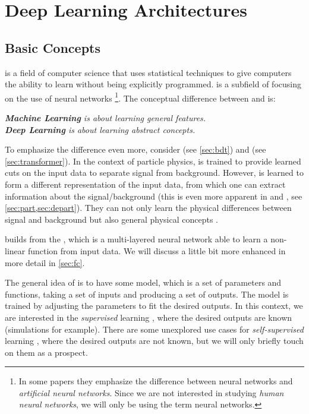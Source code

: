 \chapter{Deep Learning Architectures}

\section{Basic Concepts}
\label{sec:basic_concepts}
\emph{\ml} is a field of computer science that uses statistical techniques to give computers the ability to learn without being explicitly programmed.
\emph{\dl} is a subfield of \ml focusing on the use of neural networks \footnote{In some papers they emphasize the difference between neural networks and \emph{artificial neural networks}. Since we are not interested in studying \emph{human neural networks}, we will only be using the term neural networks.}.
The conceptual difference between \ml and \dl is:
\begin{center}
    \emph{\textbf{Machine Learning} is about learning general features. \\ \textbf{Deep Learning} is about learning abstract concepts.}
\end{center}

To emphasize the difference even more, consider \bdt (see \cref{sec:bdt}) and \trans (see \cref{sec:transformer}). 
In the context of particle physics, \bdt is trained to provide learned cuts on the input data to separate signal from background.
However, \trans is learned to form a different representation of the input data, from which one can extract information about the signal/background (this is even more apparent in \ParT and \depart, see \cref{sec:part,sec:depart}).
They can not only learn the physical differences between signal and background but also general physical concepts \cite{qcd_as_nlp}. 

\dl builds from the \mlp \cite{mlp}, which is a multi-layered neural network able to learn a non-linear function from input data.
We will discuss a little bit more enhanced \mlp in more detail in \cref{sec:fc}.

The general idea of \dl is to have some model, which is a set of parameters and functions, taking a set of inputs and producing a set of outputs.
The model is trained by adjusting the parameters to fit the desired outputs.
In this context, we are interested in the \emph{supervised} learning \cite{deeplearningbook}, where the desired outputs are known (\MC simulations for example).
There are some unexplored use cases for \emph{self-supervised} learning \cite{masked_autoencoders}, where the desired outputs are not known, but we will only briefly touch on them as a prospect.
